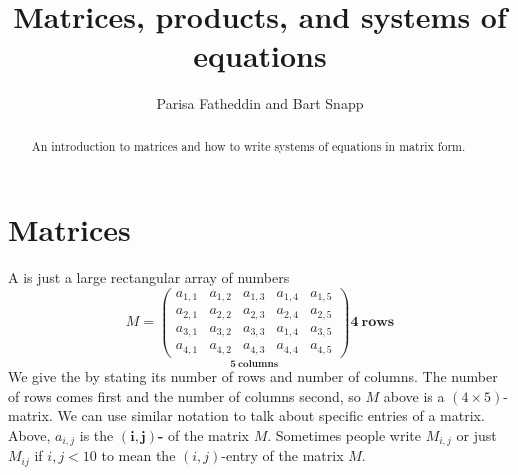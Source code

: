 \documentclass{ximera}
\author{Parisa Fatheddin and Bart Snapp}
\title{Matrices, products, and systems of equations}
\begin{document}
\begin{abstract}
  An introduction to matrices and how to write systems of equations in matrix form. 
\end{abstract}
\maketitle

\section{Matrices}


A  is just a large rectangular array of numbers
\[
M =
\underset{\displaystyle\boldsymbol{5}~\textbf{columns}}{\begin{pmatrix}
  a_{1,1} & a_{1,2} & a_{1,3} & a_{1,4} & a_{1,5} \\
  a_{2,1} & a_{2,2} & a_{2,3} & a_{2,4} & a_{2,5} \\
  a_{3,1} & a_{3,2} & a_{3,3} & a_{1,4} & a_{3,5} \\
  a_{4,1} & a_{4,2} & a_{4,3} & a_{4,4} & a_{4,5}
\end{pmatrix}}
\boldsymbol{4}~\textbf {rows}
\]
We give the  by stating its number of rows
and number of columns. The number of rows comes first and the number of columns second, so $M$ above is
a $(4\times 5)$-matrix. We can use similar notation to talk about
specific entries of a matrix. Above, $a_{i,j}$ is the
$\boldsymbol{(i,j)}${\bf-} of the matrix $M$. Sometimes people write $M_{i,j}$ or just $M_{ij}$ if $i,j <10$ to mean the $(i,j)$-entry of the matrix $M$.
\end{document}
